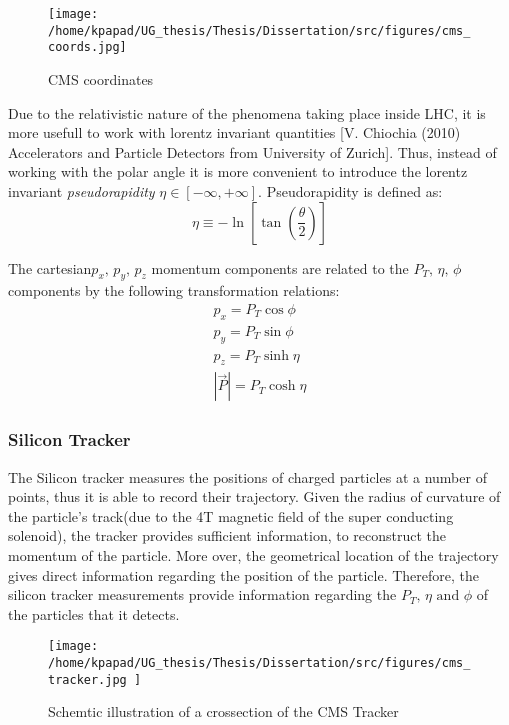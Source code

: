 \begin{figure}[ht]
\centering
\texttt{[image: /home/kpapad/UG\_thesis/Thesis/Dissertation/src/figures/cms\_coords.jpg]}
\caption{CMS coordinates}
\label{fig:CMSCoords}
\end{figure}


Due to the relativistic nature of the phenomena taking place inside LHC, it is more usefull to work with lorentz invariant quantities [V. Chiochia (2010) Accelerators and Particle Detectors from University of Zurich]. Thus, instead of working with the polar angle it is more convenient to introduce the lorentz invariant  \emph{pseudorapidity} \(\eta\in \left [ -\infty, +\infty \right ]\).  Pseudorapidity is defined as:
\begin{equation}
\eta \equiv -\ln{\left [ \tan\left (\frac{\theta}{2} \right ) \right]  }
\end{equation}

The cartesian\(p_{x}\text{, } p_{y}\text{, }p_{z}\) momentum components are related to the \(P_{T}\text{, }\eta\text{, }\phi\)  components by the following transformation relations:
\begin{equation}
\begin{matrix}
p_{x} = P_{T}\cos{\phi} \\
p_{y} = P_{T}\sin{\phi} \\
p_{z} = P_{T}\sinh{\eta}\\
|\vec{P}| = P_{T}\cosh{\eta} 
\end{matrix}
\end{equation}

\subsubsection{Silicon Tracker}
\label{sec:orga7d0d18}
The Silicon tracker measures the positions of charged particles at a number of points, thus it is able to record their trajectory. Given the radius of curvature of the particle's track(due to the 4T magnetic field of the super conducting solenoid), the tracker provides sufficient information, to reconstruct the momentum of the particle. More over, the geometrical location of the trajectory gives direct information regarding the position of the particle. Therefore, the silicon tracker measurements  provide  information regarding the \(P_{T}\text{, } \eta\text{ and }\phi\) of the particles that it detects.

\begin{figure}[ht]
\centering
\texttt{[image: /home/kpapad/UG\_thesis/Thesis/Dissertation/src/figures/cms\_tracker.jpg ]}
\caption{Schemtic illustration of a crossection of the CMS Tracker }
\label{fig:si_tracker}
\end{figure}



